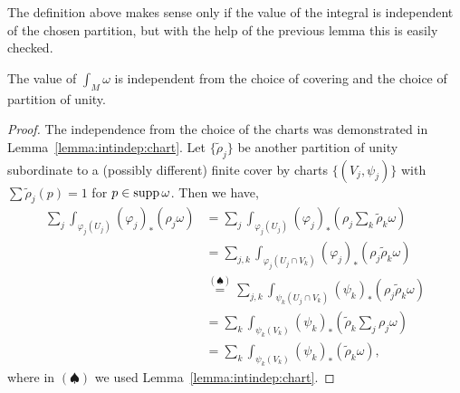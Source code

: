 The definition above makes sense only if the value of the integral is independent of the chosen partition, but with the help of the previous lemma this is easily checked.

\begin{lemma}\label{lemma:intinman}
	The value of $\int_M\omega$ is independent from the choice of covering and the choice of partition of unity.
\end{lemma}
\begin{proof}
	The independence from the choice of the charts was demonstrated in Lemma~\ref{lemma:intindep:chart}.
	Let $\{\widetilde\rho_j\}$ be another partition of unity subordinate to a (possibly different) finite cover by charts $\{(V_j, \psi_j)\}$ with $\sum \widetilde\rho_j(p) = 1$ for $p\in\operatorname{supp}\omega$.
	Then we have,
	\begin{align}
		\sum_j \int_{\varphi_j(U_j)} (\varphi_j)_*\left(\rho_j \omega\right)
		 & = \sum_j \int_{\varphi_j(U_j)} (\varphi_j)_*\left(\rho_j \sum_k \widetilde\rho_k\omega\right)                         \\
		 & = \sum_{j,k} \int_{\varphi_j(U_j\cap V_k)} (\varphi_j)_* \left(\rho_j \widetilde\rho_k\omega\right)                   \\
		 & \overset{(\spadesuit)}{=} \sum_{j,k} \int_{\psi_k(U_j\cap V_k)} (\psi_k)_* \left(\rho_j \widetilde\rho_k\omega\right) \\
		 & = \sum_k \int_{\psi_k(V_k)} (\psi_k)_*\left(\widetilde\rho_k \sum_j\rho_j \omega\right)                               \\
		 & = \sum_k \int_{\psi_k(V_k)} (\psi_k)_*\left( \widetilde\rho_k \omega\right),
	\end{align}
	where in $(\spadesuit)$ we used Lemma~\ref{lemma:intindep:chart}.
\end{proof}

